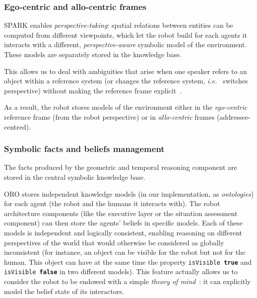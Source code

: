 \documentclass[preprint,5p]{elsarticle}
\newcommand{\concept}[1]{{\small \texttt{#1}}}
\newcommand{\ie}{{\textit{i.e.\ }}}
\begin{document}
\subsubsection{Ego-centric and allo-centric frames}

SPARK enables \emph{perspective-taking}: spatial relations between entities can
be computed from different viewpoints, which let the robot build for each
agents it interacts with a different, \emph{perspective-aware} symbolic model
of the environment. These models are separately stored in the knowledge base.

This allows us to deal with ambiguities that arise when one speaker refers to
an object within a reference system (or changes the reference system, \ie
switches perspective) without making the reference frame
explicit~\cite{Breazeal2006, Ros2010}.

As a result, the robot stores models of the environment either in the
\emph{ego-centric} reference frame (from the robot perspective) or in 
\emph{allo-centric} frames (addressee-centred).


\subsubsection{Symbolic facts and beliefs management}

The facts produced by the geometric and temporal reasoning component
are stored in the central symbolic knowledge base.

ORO stores independent knowledge models (in our implementation, as
\emph{ontologies}) for each agent (the robot and the humans it
interacts with). The robot architecture components (like the executive
layer or the situation assessment component) can then store the
agents' beliefs in specific models.  Each of these models is
independent and logically consistent, enabling reasoning on different
perspectives of the world that would otherwise be considered as
globally inconsistent (for instance, an object can be visible for the
robot but not for the human. This object can have at the same time the
property \concept{isVisible \textbf{true}} and \concept{isVisible
  \textbf{false}} in two different models). This feature actually
allows us to consider the robot to be endowed with a simple
\emph{theory of mind}~\cite{Scassellati2002}: it can explicitly
model the belief state of its interactors.


\end{document}
